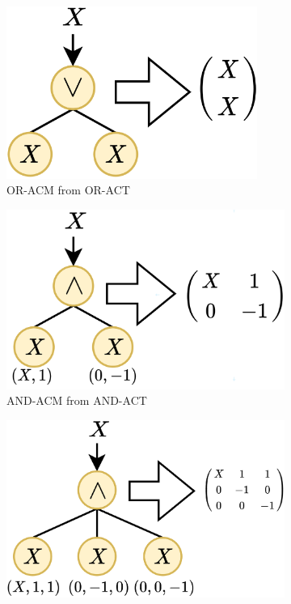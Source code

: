 \begin{figure}[h]
\vspace{-10pt}
     \centering
     \begin{subfigure}[b]{0.3\textwidth}
         \centering
         \includegraphics[width=0.9\textwidth]{image/lsss/oract.png}
         \caption{OR-ACM from OR-ACT}
         \label{fig:oracm}
     \end{subfigure}
     \hfill
     \begin{subfigure}[b]{0.3\textwidth}
         \centering
         \includegraphics[width=\textwidth]{image/lsss/and2act.png}
         \caption{AND-ACM from AND-ACT}
         \label{fig:and2acm}
     \end{subfigure}
     \hfill
        \begin{subfigure}[b]{0.3\textwidth}
         \centering
         \includegraphics[width=\textwidth]{image/lsss/and3act.png}

\end{subfigure}
\end{figure}
